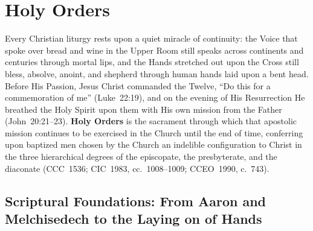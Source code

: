 \section{Holy Orders}
\label{sec:orders}

Every Christian liturgy rests upon a quiet miracle of continuity: the Voice that spoke over bread and wine in the Upper Room still speaks across continents and centuries through mortal lips, and the Hands stretched out upon the Cross still bless, absolve, anoint, and shepherd through human hands laid upon a bent head. Before His Passion, Jesus Christ commanded the Twelve, ``Do this for a commemoration of me'' (Luke~22:19), and on the evening of His Resurrection He breathed the Holy Spirit upon them with His own mission from the Father (John~20:21--23). \textbf{Holy Orders} is the sacrament through which that apostolic mission continues to be exercised in the Church until the end of time, conferring upon baptized men chosen by the Church an indelible configuration to Christ in the three hierarchical degrees of the episcopate, the presbyterate, and the diaconate (CCC~1536; CIC~1983, cc.~1008--1009; CCEO~1990, c.~743).

\subsection{Scriptural Foundations: From Aaron and Melchisedech to the Laying on of Hands}
\label{subsec:orders-scripture}

